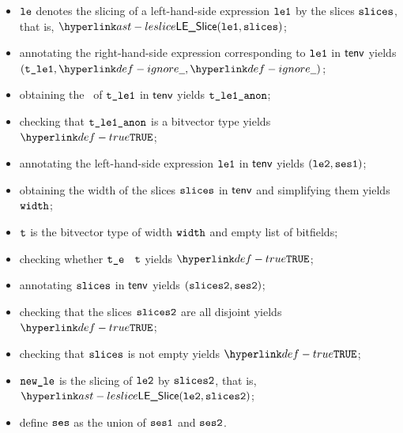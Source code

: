 \ProseParagraph
\AllApply
\begin{itemize}
  \item $\texttt{le}$ denotes the slicing of a left-hand-side expression $\texttt{le1}$ by the slices $\texttt{slices}$, that is, $\LESlice(\vleone, \slices)$;
  \item annotating the right-hand-side expression corresponding to $\texttt{le1}$ in $\textsf{tenv}$ yields \\
        $(\vtleone, \Ignore, \Ignore)$\ProseOrTypeError;
  \item obtaining the \underlyingtype\ of $\texttt{t\_le1}$ in $\textsf{tenv}$ yields $\texttt{t\_le1\_anon}$\ProseOrTypeError;
  \item checking that $\texttt{t\_le1\_anon}$ is a bitvector type yields $\True$\ProseTerminateAs{\UnexpectedType};
  \item annotating the left-hand-side expression $\texttt{le1}$ in $\textsf{tenv}$ yields $(\texttt{le2}, \texttt{ses1})$\ProseOrTypeError;
  \item obtaining the width of the slices $\texttt{slices}$ in $\textsf{tenv}$ and simplifying them yields $\texttt{width}$;
  \item $\texttt{t}$ is the bitvector type of width $\texttt{width}$ and empty list of bitfields;
  \item checking whether $\texttt{t\_e}$ \typesatisfies\ $\texttt{t}$ yields $\True$\ProseOrTypeError;
  \item annotating $\texttt{slices}$ in $\textsf{tenv}$ yields $(\texttt{slices2}, \texttt{ses2})$\ProseOrTypeError;
  \item checking that the slices $\texttt{slices2}$ are all disjoint yields $\True$\ProseOrTypeError;
  \item checking that $\texttt{slices}$ is not empty yields $\True$\ProseTerminateAs{\BadSlices};
  \item $\texttt{new\_le}$ is the slicing of $\texttt{le2}$ by $\texttt{slices2}$, that is, $\LESlice(\vletwo, \slicestwo)$;
  \item define $\texttt{ses}$ as the union of $\texttt{ses1}$ and $\texttt{ses2}$.
\end{itemize}
\FormallyParagraph
